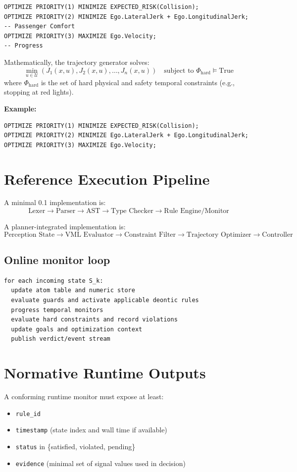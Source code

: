 \documentclass[11pt,a4paper]{article}
\begin{document}
\begin{lstlisting}
OPTIMIZE PRIORITY(1) MINIMIZE EXPECTED_RISK(Collision);
OPTIMIZE PRIORITY(2) MINIMIZE Ego.LateralJerk + Ego.LongitudinalJerk; -- Passenger Comfort
OPTIMIZE PRIORITY(3) MAXIMIZE Ego.Velocity;                           -- Progress
\end{lstlisting}

Mathematically, the trajectory generator solves:
\[
\min_{u \in \mathcal{U}} \left( J_1(x,u), J_2(x,u), \dots, J_n(x,u) \right) \quad \text{subject to } \Phi_{\text{hard}} \models \text{True}
\]
where $\Phi_{\text{hard}}$ is the set of hard physical and safety temporal constraints (e.g., stopping at red lights).


\textbf{Example:}
\begin{lstlisting}
OPTIMIZE PRIORITY(1) MINIMIZE EXPECTED_RISK(Collision);
OPTIMIZE PRIORITY(2) MINIMIZE Ego.LateralJerk + Ego.LongitudinalJerk;
OPTIMIZE PRIORITY(3) MAXIMIZE Ego.Velocity;
\end{lstlisting}

\section{Reference Execution Pipeline}
A minimal 0.1 implementation is:
\[
\text{Lexer} \rightarrow \text{Parser} \rightarrow \text{AST} \rightarrow \text{Type Checker} \rightarrow \text{Rule Engine/Monitor}
\]

A planner-integrated implementation is:
\[
\text{Perception State} \rightarrow \text{VML Evaluator} \rightarrow \text{Constraint Filter} \rightarrow \text{Trajectory Optimizer} \rightarrow \text{Controller}
\]

\subsection{Online monitor loop}
\begin{lstlisting}
for each incoming state S_k:
  update atom table and numeric store
  evaluate guards and activate applicable deontic rules
  progress temporal monitors
  evaluate hard constraints and record violations
  update goals and optimization context
  publish verdict/event stream
\end{lstlisting}

\section{Normative Runtime Outputs}
A conforming runtime monitor must expose at least:
\begin{itemize}[leftmargin=*]
  \item \texttt{rule\_id}
  \item \texttt{timestamp} (state index and wall time if available)
  \item \texttt{status} in \{satisfied, violated, pending\}
  \item \texttt{evidence} (minimal set of signal values used in decision)
\end{itemize}
\end{document}

